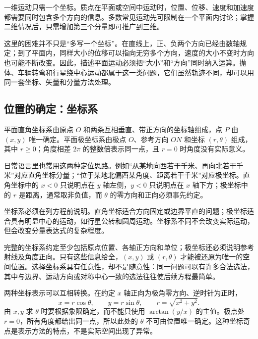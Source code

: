 
一维运动只需一个坐标。质点在平面或空间中运动时，位置、位移、速度和加速度都需要同时包含多个方向的信息。多数常见运动先可限制在一个平面内讨论；掌握二维情况后，只需增加第三个分量即可推广到三维。

这里的困难并不只是“多写一个坐标”。在直线上，正、负两个方向已经由数轴规定；到了平面内，同样大小的位移可以指向无穷多个方向，速度的大小不变时方向也可能不断改变。因此，描述平面运动必须把“大小”和“方向”同时纳入运算。抛体、车辆转弯和行星绕中心运动都属于这一类问题，它们虽然轨迹不同，却可以用同一套坐标、矢量和分量方法处理。

\subsection{位置的确定：坐标系}

平面直角坐标系由原点 $O$ 和两条互相垂直、带正方向的坐标轴组成，点 $P$ 由 $(x,y)$ 唯一确定。平面极坐标系由极点 $O$、参考方向 $ON$ 和坐标 $(r,\theta)$ 组成，其中 $r\ge0$；角度相差 $2\pi$ 的整数倍表示同一点，且 $r=0$ 时角度没有实际意义。

日常语言里也常用这两种定位思路。例如“从某地向西若干千米、再向北若干千米”对应直角坐标分量；“位于某地北偏西某角度、距离若干千米”对应极坐标。直角坐标中的 $x<0$ 只说明点在 $y$ 轴左侧，$y<0$ 只说明点在 $x$ 轴下方；极坐标中的 $r$ 是距离，通常取非负值，而 $\theta$ 的零方向和正向必须事先约定。

\CoordinateSystemsDiagram

坐标系必须在列方程前说明。直角坐标适合方向固定或边界平直的问题；极坐标适合具有明显中心的运动，如行星公转和圆周运动。坐标系不同不会改变实际运动，但会改变分量表达式的复杂程度。

完整的坐标系约定至少包括原点位置、各轴正方向和单位；极坐标还必须说明参考射线及角度正向。只有这些信息给全，$(x,y)$ 或 $(r,\theta)$ 才能被还原为唯一的空间位置。选择坐标系具有任意性，却不是随意性：同一问题可以有许多合法选法，其中与边界、运动方向或对称中心一致的选法往往使后续方程最简单。

两种坐标表示可以互相转换。在约定 $x$ 轴正向为极角零方向、逆时针为正时，
\begin{equation}
 x=r\cos\theta,\qquad y=r\sin\theta,\qquad
 r=\sqrt{x^2+y^2}.
\end{equation}
由 $x,y$ 求 $\theta$ 时要根据象限确定，而不能只使用 $\arctan(y/x)$ 的主值。极点处 $r=0$，所有角度都给出同一点，所以此处的 $\theta$ 不可由位置唯一确定。这种坐标奇点是表示方法的特点，不是实际空间出现了异常。

